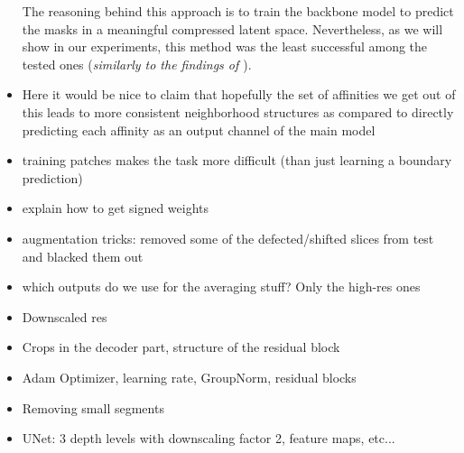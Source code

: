 \begin{itemize}
{The reasoning behind this approach is to train the backbone model to predict the masks in a meaningful compressed latent space. 
Nevertheless, as we will show in our experiments, this method was the least successful among the tested ones (\emph{similarly to the findings of \cite{hirsch2020patchperpix}}).}
\item Here it would be nice to claim that hopefully the set of affinities we get out of this leads to more consistent neighborhood structures as compared to directly predicting each affinity as an output channel of the main model
\item training patches makes the task more difficult (than just learning a boundary prediction)
\item explain how to get signed weights
\item augmentation tricks: removed some of the defected/shifted slices from test and blacked them out
\item which outputs do we use for the averaging stuff? Only the high-res ones
\item Downscaled res
\item Crops in the decoder part, structure of the residual block
\item Adam Optimizer, learning rate, GroupNorm, residual blocks
\item Removing small segments
\item UNet: 3 depth levels with downscaling factor 2, feature maps, etc...

\end{itemize}


